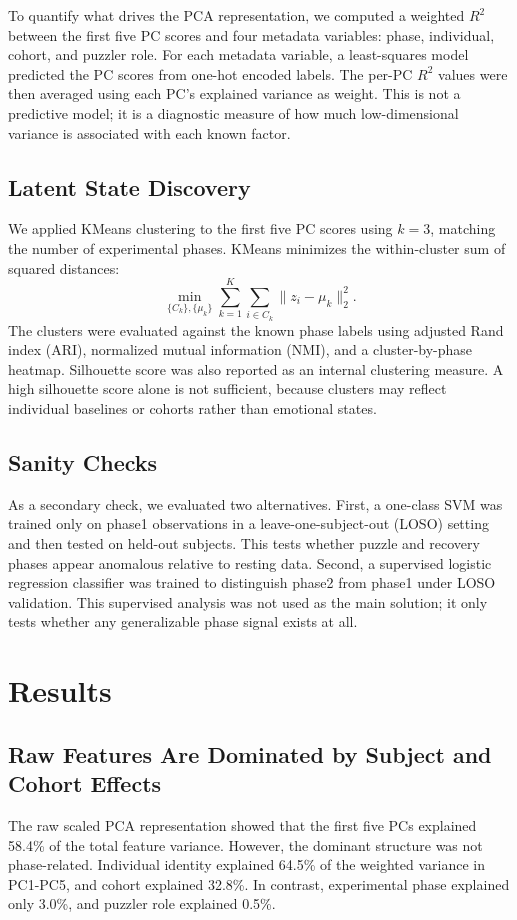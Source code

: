 \documentclass{article}
\begin{document}
To quantify what drives the PCA representation, we computed a weighted $R^2$ between the first five PC scores and four metadata variables: phase, individual, cohort, and puzzler role. For each metadata variable, a least-squares model predicted the PC scores from one-hot encoded labels. The per-PC $R^2$ values were then averaged using each PC's explained variance as weight. This is not a predictive model; it is a diagnostic measure of how much low-dimensional variance is associated with each known factor.

\subsection*{Latent State Discovery}
We applied KMeans clustering to the first five PC scores using $k=3$, matching the number of experimental phases. KMeans minimizes the within-cluster sum of squared distances:
\[
\min_{\{C_k\}, \{\mu_k\}} \sum_{k=1}^{K} \sum_{i \in C_k} \|z_i - \mu_k\|_2^2.
\]
The clusters were evaluated against the known phase labels using adjusted Rand index (ARI), normalized mutual information (NMI), and a cluster-by-phase heatmap. Silhouette score was also reported as an internal clustering measure. A high silhouette score alone is not sufficient, because clusters may reflect individual baselines or cohorts rather than emotional states.

\subsection*{Sanity Checks}
As a secondary check, we evaluated two alternatives. First, a one-class SVM was trained only on phase1 observations in a leave-one-subject-out (LOSO) setting and then tested on held-out subjects. This tests whether puzzle and recovery phases appear anomalous relative to resting data. Second, a supervised logistic regression classifier was trained to distinguish phase2 from phase1 under LOSO validation. This supervised analysis was not used as the main solution; it only tests whether any generalizable phase signal exists at all.

\section*{Results}
\subsection*{Raw Features Are Dominated by Subject and Cohort Effects}
The raw scaled PCA representation showed that the first five PCs explained 58.4\% of the total feature variance. However, the dominant structure was not phase-related. Individual identity explained 64.5\% of the weighted variance in PC1-PC5, and cohort explained 32.8\%. In contrast, experimental phase explained only 3.0\%, and puzzler role explained 0.5\%.
\end{document}
